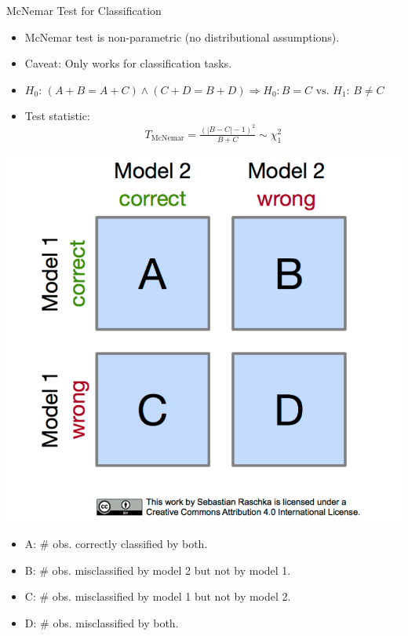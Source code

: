 \documentclass[11pt,compress,t,notes=noshow, aspectratio=169, xcolor=table]{beamer}
\begin{document}
\begin{frame}{McNemar Test for Classification}
\begin{itemize}
\item McNemar test is non-parametric (no distributional assumptions).
\item Caveat: Only works for classification tasks.
\item $H_0$: $(A + B = A + C) \land (C + D = B + D) \Rightarrow H_0: B = C \text{ vs. } H_1$:  $B \neq C$
\item Test statistic:
$$T_{\text{McNemar}} =  \tfrac{(|B-C| - 1)^2}{B + C} \sim \chi^2_{1}
$$
\end{itemize}

\begin{minipage}{0.45\textwidth}
\includegraphics[width=\textwidth]{figure/mcnemar_1.png} \end{minipage}
\begin{minipage}{0.54\textwidth}
\begin{itemize}
\item A: $\#$ obs. correctly classified by both.
\item B: $\#$ obs. misclassified by model 2 but not by model 1.
\item C: $\#$ obs. misclassified by model 1 but not by model 2.
\item D: $\#$ obs. misclassified by both.
\end{itemize}
\end{minipage}
\end{frame}
\end{document}
